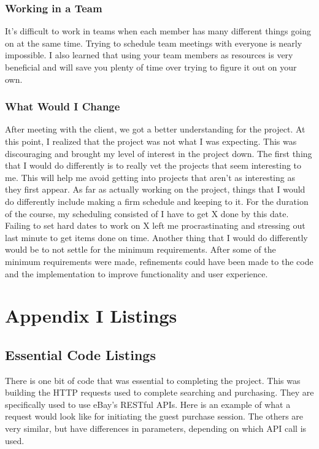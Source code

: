 \documentclass[journal,compsoc, 10pt, draftclsnofoot, onecolumn]{IEEEtran}
\begin{document}
\subsubsection{Working in a Team}
It's difficult to work in teams when each member has many different things 
going on at the same time. Trying to schedule team meetings with everyone 
is nearly impossible. I also learned that using your team members as resources 
is very beneficial and will save you plenty of time over trying to figure it out 
on your own.

\subsubsection{What Would I Change}
After meeting with the client, we got a better understanding for the project. 
At this point, I realized that the project was not what I was expecting. This 
was discouraging and brought my level of interest in the project down. The 
first thing that I would do differently is to really vet the projects that seem 
interesting to me. This will help me avoid getting into projects that aren't as 
interesting as they first appear. As far as actually working on the project, 
things that I would do differently include making a firm schedule and keeping 
to it. For the duration of the course, my scheduling consisted of I have to 
get X done by this date. Failing to set hard dates to work on X left me 
procrastinating and stressing out last minute to get items done on time. 
Another thing that I would do differently would be to not settle for the minimum 
requirements. After some of the minimum requirements were made, 
refinements could have been made to the code and the implementation to 
improve functionality and user experience. 

\section{Appendix I Listings}

\subsection{Essential Code Listings}
There is one bit of code that was essential to completing the project. This was 
building the HTTP requests used to complete searching and purchasing. They 
are specifically used to use eBay's RESTful APIs. Here is an example of what a 
request would look like for initiating the guest purchase session. The others are very similar, 
but have differences in parameters, depending on which API call is used. 
\end{document}

